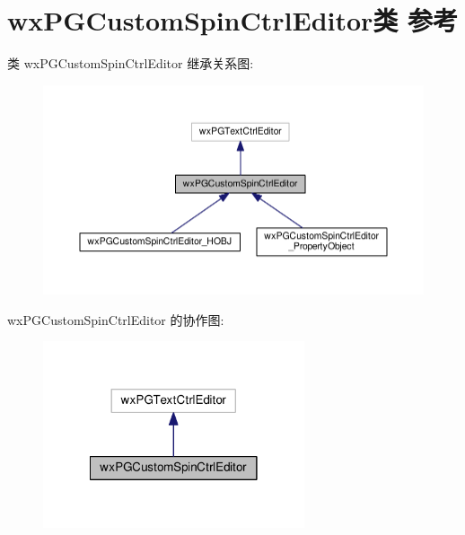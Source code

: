 \hypertarget{classwx_p_g_custom_spin_ctrl_editor}{\section{wx\+P\+G\+Custom\+Spin\+Ctrl\+Editor类 参考}
\label{classwx_p_g_custom_spin_ctrl_editor}
}


类 wx\+P\+G\+Custom\+Spin\+Ctrl\+Editor 继承关系图\+:
\nopagebreak
\begin{figure}[H]
\begin{center}
\leavevmode
\includegraphics[width=350pt]{classwx_p_g_custom_spin_ctrl_editor__inherit__graph}
\end{center}
\end{figure}


wx\+P\+G\+Custom\+Spin\+Ctrl\+Editor 的协作图\+:
\nopagebreak
\begin{figure}[H]
\begin{center}
\leavevmode
\includegraphics[width=218pt]{classwx_p_g_custom_spin_ctrl_editor__coll__graph}
\end{center}
\end{figure}
